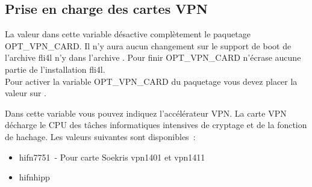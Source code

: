 \begin{description}
\subsection {Prise en charge des cartes VPN}


  La valeur  dans cette variable désactive complètement le paquetage
  OPT\_VPN\_CARD. Il n'y aura aucun changement sur le support de boot de
  l'archive fli4l  n'y dans l'archive . Pour finir
  OPT\_VPN\_CARD n'écrase aucune partie de l'installation fli4l.\\
  Pour activer la variable OPT\_VPN\_CARD du paquetage 
  vous devez placer la valeur sur .


  Dans cette variable vous pouvez indiquez l'accélérateur VPN. La carte VPN
  décharge le CPU des tâches informatiques intensives de cryptage et de la
  fonction de hachage. Les valeurs suivantes sont disponibles~:

  \begin{itemize}
    \item hifn7751~- Pour carte Soekris vpn1401 et vpn1411
    \item hifnhipp
  \end{itemize}

\end{description}
